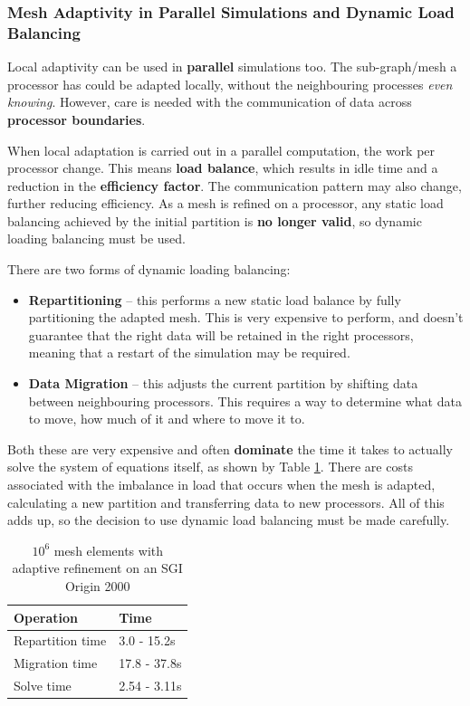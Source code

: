 \documentclass{article}
\begin{document}
\subsubsection{Mesh Adaptivity in Parallel Simulations and Dynamic Load Balancing}

Local adaptivity can be used in \textbf{parallel} simulations too. The sub-graph/mesh a processor has could be adapted locally, without the neighbouring processes \textit{even knowing}. However, care is needed with the communication of data across \textbf{processor boundaries}.

When local adaptation is carried out in a parallel computation, the work per processor change. This means \textbf{load balance}, which results in idle time and a reduction in the \textbf{efficiency factor}. The communication pattern may also change, further reducing efficiency. As a mesh is refined on a processor, any static load balancing achieved by the initial partition is \textbf{no longer valid}, so dynamic loading balancing must be used.

There are two forms of dynamic loading balancing:
\begin{itemize}
	\item \textbf{Repartitioning} -- this performs a new static load balance by fully partitioning the adapted mesh. This is very expensive to perform, and doesn't guarantee that the right data will be retained in the right processors, meaning that a restart of the simulation may be required. 
	\item \textbf{Data Migration} -- this adjusts the current partition by shifting data between neighbouring processors. This requires a way to determine what data to move, how much of it and where to move it to.
\end{itemize}

Both these are very expensive and often \textbf{dominate} the time it takes to actually solve the system of equations itself, as shown by Table \ref{tab:dynamic-load-balancing-costs}. There are costs associated with the imbalance in load that occurs when the mesh is adapted, calculating a new partition and transferring data to new processors. All of this adds up, so the decision to use dynamic load balancing must be made carefully.

\begin{table}
	\centering
	\begin{tabular}{|l|l|}
		\hline
		\textbf{Operation} & \textbf{Time} \\
		\hline
		Repartition time & 3.0 - 15.2s \\
		Migration time & 17.8 - 37.8s \\
		Solve time & 2.54 - 3.11s \\
		\hline
	\end{tabular}
	\caption{$10^6$ mesh elements with adaptive refinement on an SGI Origin 2000}
	\label{tab:dynamic-load-balancing-costs}
\end{table}
\end{document}

